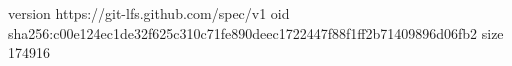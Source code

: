version https://git-lfs.github.com/spec/v1
oid sha256:c00e124ec1de32f625c310c71fe890deec1722447f88f1ff2b71409896d06fb2
size 174916
